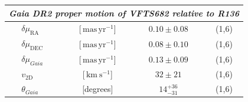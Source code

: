 \documentclass[a4paper,fleqn,usenatbib]{mnras}
\newcommand{\SdM}[1]{{{\color{brown}{#1}}}}
\newcommand{\kms}{{\,\mathrm{km\ s^{-1}}}}
\newcommand{\masyr}{\,\mathrm{mas}\,\mathrm{yr}^{-1}}
\begin{document}
\begin{table}
\begin{center}
\begin{tabular}{llc|c|c}
                


      \multicolumn{5}{l}{\emph{Gaia DR2 proper motion of VFTS682 relative
      to R136}}\\
      \hline
      &$\delta\mu_\mathrm{RA}$  &[$\masyr$] & $0.10\pm0.08$ & (1,6) \\
      &$\delta\mu_\mathrm{DEC}$  &[$\masyr$] & $0.08\pm0.10$ &  (1,6) \\
      &$\delta\mu_{Gaia}$  &[$\masyr$] & $0.13\pm0.09$ &  (1,6) \\
      &$v_\mathrm{2D}$  &[$\kms$] & $32\pm21$ & (1,6)\\  
      &$\theta_{Gaia}$  &[degrees] &  $14_{-31}^{+36}$  & (1,6)\\  


\end{tabular}
\end{center}
\end{table}
\end{document}
